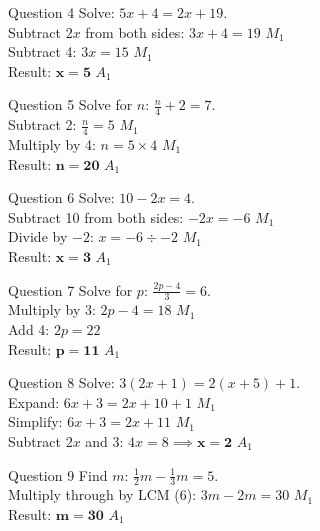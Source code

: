\documentclass[12pt, a4paper, oneside]{article}
\begin{document}
\begin{solvingbox}{Question 4}
Solve: $5x + 4 = 2x + 19$. \\
Subtract $2x$ from both sides: $3x + 4 = 19$ \hfill $M_1$ \\
Subtract 4: $3x = 15$ \hfill $M_1$ \\
Result: $\mathbf{x = 5}$ \hfill $A_1$
\end{solvingbox}

\begin{solvingbox}{Question 5}
Solve for $n$: $\frac{n}{4} + 2 = 7$. \\
Subtract 2: $\frac{n}{4} = 5$ \hfill $M_1$ \\
Multiply by 4: $n = 5 \times 4$ \hfill $M_1$ \\
Result: $\mathbf{n = 20}$ \hfill $A_1$
\end{solvingbox}

\begin{solvingbox}{Question 6}
Solve: $10 - 2x = 4$. \\
Subtract 10 from both sides: $-2x = -6$ \hfill $M_1$ \\
Divide by $-2$: $x = -6 \div -2$ \hfill $M_1$ \\
Result: $\mathbf{x = 3}$ \hfill $A_1$
\end{solvingbox}

\begin{solvingbox}{Question 7}
Solve for $p$: $\frac{2p - 4}{3} = 6$. \\
Multiply by 3: $2p - 4 = 18$ \hfill $M_1$ \\
Add 4: $2p = 22$ \\
Result: $\mathbf{p = 11}$ \hfill $A_1$
\end{solvingbox}

\begin{solvingbox}{Question 8}
Solve: $3(2x + 1) = 2(x + 5) + 1$. \\
Expand: $6x + 3 = 2x + 10 + 1$ \hfill $M_1$ \\
Simplify: $6x + 3 = 2x + 11$ \hfill $M_1$ \\
Subtract $2x$ and 3: $4x = 8 \implies \mathbf{x = 2}$ \hfill $A_1$
\end{solvingbox}

\begin{solvingbox}{Question 9}
Find $m$: $\frac{1}{2}m - \frac{1}{3}m = 5$. \\
Multiply through by LCM (6): $3m - 2m = 30$ \hfill $M_1$ \\
Result: $\mathbf{m = 30}$ \hfill $A_1$
\end{solvingbox}
\end{document}
